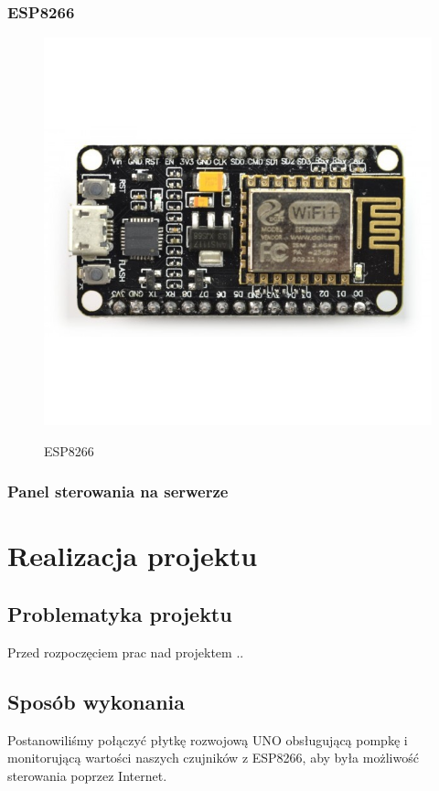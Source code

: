 \documentclass[12pt]{article}
\begin{document}
\subsubsection{ESP8266}
\begin{figure}[!h]
	\begin{center}
		{\includegraphics[width=12cm]{esp8266_photo.png}}
	\end{center}
	\caption{ESP8266}
\end{figure}
\subsubsection{Panel sterowania na serwerze}

\section{Realizacja projektu}
\subsection{Problematyka projektu}
Przed rozpoczęciem prac nad projektem .. 

\subsection{Sposób wykonania}
Postanowiliśmy połączyć płytkę rozwojową UNO obsługującą pompkę i monitorującą wartości naszych czujników z ESP8266, aby była możliwość sterowania poprzez Internet.
\end{document}
